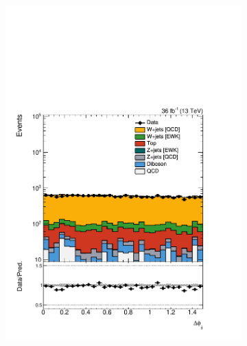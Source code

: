 \begin{figure}[]
\begin{center}
\begin{subfigure}[t]{0.24\textwidth}
            \includegraphics[width=\textwidth]{figures/vbf/prefit/singleelectron_jot12DPhi_logy.pdf}
        \end{subfigure}
        \begin{subfigure}[t]{0.24\textwidth}

\end{subfigure}
\end{center}
\end{figure}
